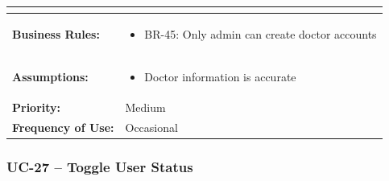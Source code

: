 \documentclass[12pt,a4paper]{article}
\begin{document}
\begin{longtable}{|p{4.5cm}|p{10.5cm}|}
\begin{itemize}
\end{itemize} \\
\hline
\textbf{Business Rules:} &
\begin{itemize}
  \item BR-45: Only admin can create doctor accounts
\end{itemize} \\
\hline
\textbf{Assumptions:} &
\begin{itemize}
  \item Doctor information is accurate
\end{itemize} \\
\hline
\textbf{Priority:} & Medium \\
\hline
\textbf{Frequency of Use:} & Occasional \\
\hline
\end{longtable}

\subsubsection{UC-27 – Toggle User Status}
\end{document}
